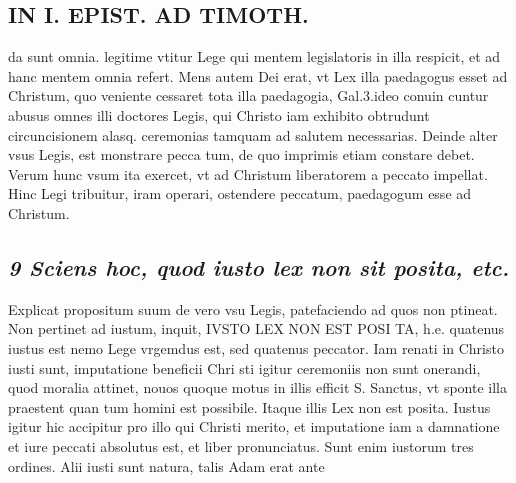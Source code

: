 \documentclass{article}
\begin{document}
\begin{pages}
\section*{IN I. EPIST. AD TIMOTH. }
\marginpar{[ p.27 ]}\pstart da sunt omnia. legitime vtitur Lege qui mentem legislatoris in illa respicit, et ad hanc mentem omnia refert. Mens autem Dei erat, vt Lex illa paedagogus esset ad Christum, quo veniente cessaret tota illa paedagogia, Gal.3.ideo conuin cuntur abusus omnes illi doctores Legis, qui Christo iam exhibito obtrudunt circuncisionem alasq. ceremonias tamquam ad salutem necessarias. Deinde alter vsus Legis, est monstrare pecca tum, de quo imprimis etiam constare debet. Verum hunc vsum ita exercet, vt ad Christum liberatorem a peccato impellat. Hinc Legi tribuitur, iram operari, ostendere peccatum, paedagogum esse ad Christum.  \pend
{}
{}
\subsection*{\textit{9 Sciens hoc, quod iusto lex non sit posita, etc. }}\pstart Explicat propositum suum de vero vsu Legis, patefaciendo ad quos non ptineat. Non pertinet ad iustum, inquit, IVSTO LEX NON EST POSI TA, h.e. quatenus iustus est nemo Lege vrgemdus est, sed quatenus peccator. Iam renati in Christo iusti sunt, imputatione beneficii Chri sti igitur ceremoniis non sunt onerandi, quod moralia attinet, nouos quoque motus in illis efficit S. Sanctus, vt sponte illa praestent quan tum homini est possibile. Itaque illis Lex non est posita. Iustus igitur hic accipitur pro illo qui Christi merito, et imputatione iam a damnatione et iure peccati absolutus est, et liber pronunciatus. Sunt enim iustorum tres ordines. Alii iusti sunt natura, talis Adam erat ante  \pend

\end{pages}
\end{document}
